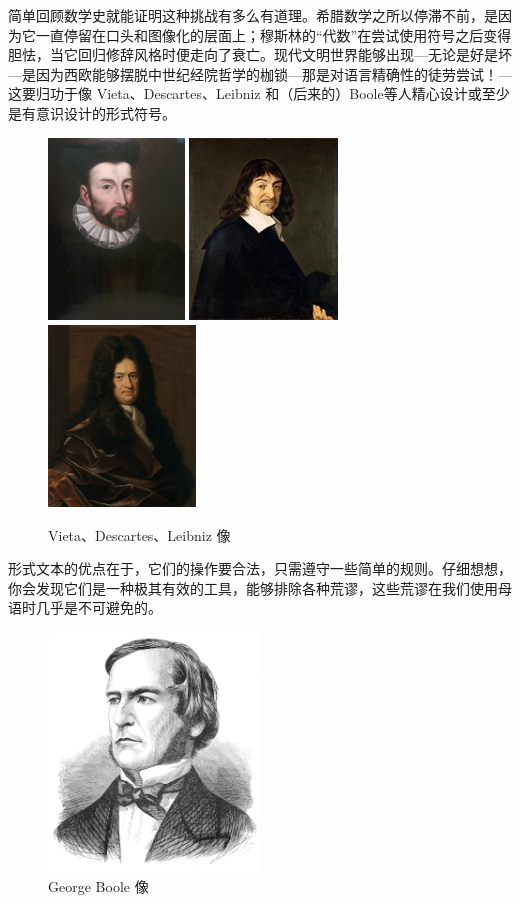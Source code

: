 \documentclass[a4paper,12pt]{article}
\begin{document}
简单回顾数学史就能证明这种挑战有多么有道理。希腊数学之所以停滞不前，是因为它一直停留在口头和图像化的层面上；穆斯林的“代数”在尝试使用符号之后变得胆怯，当它回归修辞风格时便走向了衰亡。现代文明世界能够出现—无论是好是坏—是因为西欧能够摆脱中世纪经院哲学的枷锁—那是对语言精确性的徒劳尝试！—这要归功于像 Vieta、Descartes、Leibniz 和（后来的）Boole等人精心设计或至少是有意识设计的形式符号。

\begin{figure}[ht]
    \centering
    \includegraphics[height=1.9in]{images/Francois_Viete.jpeg}
    \includegraphics[height=1.9in]{images/Descartes.jpeg}
    \includegraphics[height=1.9in]{images/Leibniz.jpeg}
    \caption{Vieta、Descartes、Leibniz 像}
\end{figure}

形式文本的优点在于，它们的操作要合法，只需遵守一些简单的规则。仔细想想，你会发现它们是一种极其有效的工具，能够排除各种荒谬，这些荒谬在我们使用母语时几乎是不可避免的。

\begin{figure}[ht]
\centering
\includegraphics[height=2.5in]{images/George_Boole.jpeg}
\caption{George Boole 像}
\end{figure}
\end{document}
